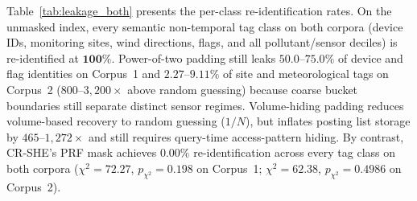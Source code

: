 \documentclass[11pt,a4paper]{article}
\begin{document}
Table~\ref{tab:leakage_both} presents the per-class re-identification rates. On the unmasked index, every semantic non-temporal tag class on both corpora (device IDs, monitoring sites, wind directions, flags, and all pollutant/sensor deciles) is re-identified at $\mathbf{100\%}$. Power-of-two padding still leaks $\mathbf{50.0\text{--}75.0\%}$ of device and flag identities on Corpus~1 and $\mathbf{2.27\text{--}9.11\%}$ of site and meteorological tags on Corpus~2 ($800\text{--}3{,}200\times$ above random guessing) because coarse bucket boundaries still separate distinct sensor regimes. Volume-hiding padding reduces volume-based recovery to random guessing ($1/N$), but inflates posting list storage by $465\text{--}1{,}272\times$ and still requires query-time access-pattern hiding. By contrast, CR-SHE's PRF mask achieves $\mathbf{0.00\%}$ re-identification across every tag class on both corpora ($\chi^2 = 72.27$, $p_{\chi^2} = 0.198$ on Corpus~1; $\chi^2 = 62.38$, $p_{\chi^2} = 0.4986$ on Corpus~2).
\end{document}
